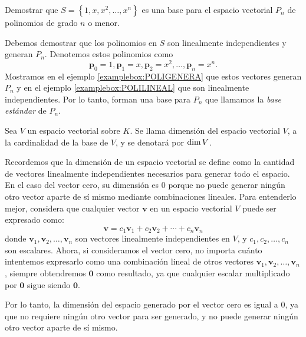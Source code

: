 \begin{examplebox}{}{}
    Demostrar que $S = \left\{1, x, x^2, \dots, x^n\right\}$ es una base para el espacio vectorial $P_n$ de polinomios de grado $n$ o menor.
    
    \tcblower
    \solucion Debemos demostrar que los polinomios en $S$ son linealmente independientes y generan $P_n$. Denotemos estos polinomios como
    $$\mathbf{p}_0 = 1, \mathbf{p}_1 = x, \mathbf{p}_2 = x^2, \dots, \mathbf{p}_n = x^n.$$
    Mostramos en el ejemplo \ref{examplebox:POLIGENERA} que estos vectores generan $P_n$ y en el ejemplo \ref{examplebox:POLILINEAL} que son linealmente independientes. Por lo tanto, forman una base para $P_n$ que llamamos la \emph{base estándar} de $P_n$.
\end{examplebox}

\begin{definicion}{}{}
    Sea $V$ un espacio vectorial sobre $K$. Se llama dimensión del espacio vectorial $V$, a la cardinalidad de la base de $V$, y se denotará por $\operatorname{dim} V$.
\end{definicion}

Recordemos que la dimensión de un espacio vectorial se define como la cantidad de vectores linealmente independientes necesarios para generar todo el espacio. En el caso del vector cero, su dimensión es $0$ porque no puede generar ningún otro vector aparte de sí mismo mediante combinaciones lineales. Para entenderlo mejor, considera que cualquier vector $\mathbf{v}$ en un espacio vectorial $V$ puede ser expresado como:
$$\mathbf{v} = c_1 \mathbf{v}_1 + c_2 \mathbf{v}_2 + \cdots + c_n \mathbf{v}_n$$
donde $\mathbf{v}_1, \mathbf{v}_2, \dots, \mathbf{v}_n$ son vectores linealmente independientes en $V$, y $c_1, c_2, \dots, c_n$ son escalares. Ahora, si consideramos el vector cero, no importa cuánto intentemos expresarlo como una combinación lineal de otros vectores $\mathbf{v}_1, \mathbf{v}_2, \dots, \mathbf{v}_n$, siempre obtendremos $\mathbf{0}$ como resultado, ya que cualquier escalar multiplicado por $\mathbf{0}$ sigue siendo $\mathbf{0}$.

Por lo tanto, la dimensión del espacio generado por el vector cero es igual a $0$, ya que no requiere ningún otro vector para ser generado, y no puede generar ningún otro vector aparte de sí mismo.

